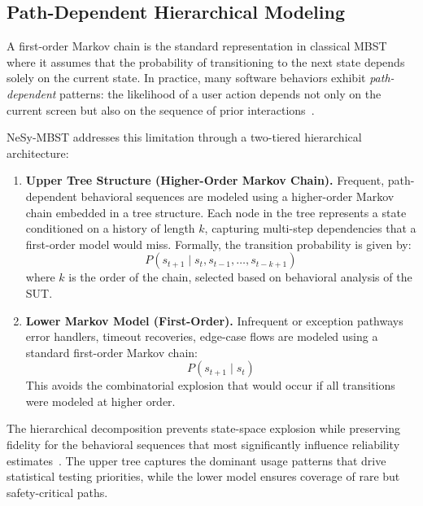 \subsection{Path-Dependent Hierarchical Modeling}%
\label{subsec:hierarchical}

A first-order Markov chain is the standard representation in classical MBST~\cite{whittaker1993markov,whittaker1994markov} where it assumes that the probability of transitioning to the next state depends solely on the current state. In practice, many software behaviors exhibit \emph{path-dependent} patterns: the likelihood of a user action depends not only on the current screen but also on the sequence of prior interactions~\cite{usage_model_web}.

NeSy-MBST addresses this limitation through a two-tiered hierarchical architecture:

\begin{enumerate}
    \item \textbf{Upper Tree Structure (Higher-Order Markov Chain).} Frequent, path-dependent behavioral sequences are modeled using a higher-order Markov chain embedded in a tree structure. Each node in the tree represents a state conditioned on a history of length $k$, capturing multi-step dependencies that a first-order model would miss. Formally, the transition probability is given by:
    \begin{equation}
        P(s_{t+1} \mid s_t, s_{t-1}, \ldots, s_{t-k+1})
        \label{eq:higher_order}
    \end{equation}
    where $k$ is the order of the chain, selected based on behavioral analysis of the SUT\@.

    \item \textbf{Lower Markov Model (First-Order).} Infrequent or exception pathways error handlers, timeout recoveries, edge-case flows are modeled using a standard first-order Markov chain:
    \begin{equation}
        P(s_{t+1} \mid s_t)
        \label{eq:first_order}
    \end{equation}
    This avoids the combinatorial explosion that would occur if all transitions were modeled at higher order.
\end{enumerate}

The hierarchical decomposition prevents state-space explosion while preserving fidelity for the behavioral sequences that most significantly influence reliability estimates~\cite{nap_statistics, markov_reliability}. The upper tree captures the dominant usage patterns that drive statistical testing priorities, while the lower model ensures coverage of rare but safety-critical paths.

